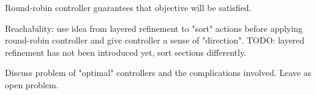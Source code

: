 Round-robin controller guarantees that objective will be satisfied.

Reachability: use idea from layered refinement to "sort" actions before applying round-robin controller and give controller a sense of "direction".
TODO: layered refinement has not been introduced yet, sort sections differently.

Discuss problem of "optimal" controllers and the complications involved.
Leave as open problem.

